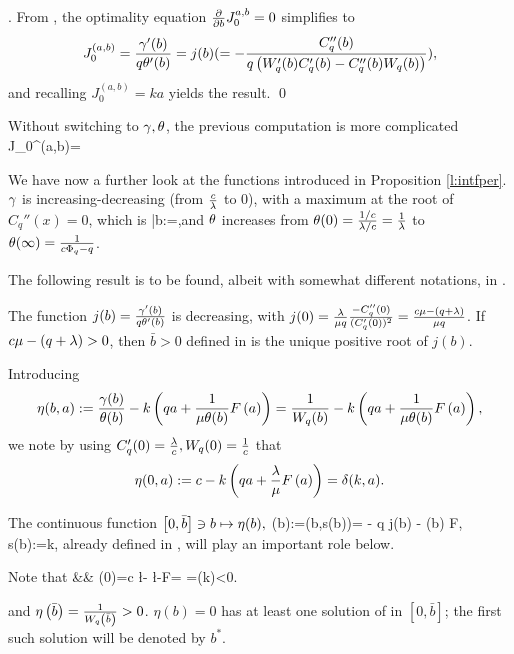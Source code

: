 . From , the optimality equation $\frac{\partial}{\partial b} J_0^{a,b}
=0$ simplifies to
$$J_0^{(a,b)}=\frac{{\gamma'(b)} }
{ q \theta'(b)}=j(b)(=-\frac{C_q''(b)}{q\left( W_q'(b) C_q'(b)-C_q''(b)  W_q(b)\right)}), $$ and recalling $J_0^{(a,b)}=k a$ yields the result.
\qed

\beR Without switching to $\gamma, \theta$, the previous computation is
more complicated
\bea J_0^{(a,b)}=
\eea

\eeR


We have now a further look at  the functions introduced in Proposition \ref{l:intfper}.
\Itm $\gamma$ is increasing-decreasing (from $\frac c {\lambda}$ to $0$), with a maximum at
the root of $C_q''(x)=0$, which is
\be {}\bar{b}:=\log{},\ee and $\theta$ increases from %
$\theta(0)=\frac{1/c}{\lambda/c}=\frac 1{\lambda}$ to $\theta(\infty)=\frac 1{c \Phi_{q} - q }$.%

The following result is to be found, albeit with somewhat different notations, in \cite[Proof of Theorem 11, A2]{AGLW}.


\beL
The function $j(b)=\frac{\gamma'(b)}{q \theta'(b)}$ is decreasing, with  $j(0)=\frac{\lambda}{\mu q}\frac{-C_q''(0)}{(C_q'(0))^2}=
\frac{c \mu -  \left(q +\lambda\right)}{\mu q}$. If  $c \mu -  \left(q +\lambda\right) >0$, then $\bar{b}>0$ defined in  is the unique positive root  of $j({b}) $.
\eeL



\beR Introducing
$$\eta(b,a):=\frac {\gamma(b)}{\theta(b)} -k \left( q a+ \frac 1{\mu \theta(b)} F\left(a\right)\right)=\frac {1}{W_q(b)} -k \left( q a+ \frac 1{\mu \theta(b)} F\left(a\right)\right),$$ we note  by using $C_q'(0)=\frac {\lambda} c, W_q(0)=\frac 1 c$ that $$\eta(0,a):=c -k \left( q a+ \frac {\lambda} {\mu }  F\left(a\right)\right)=\delta(k,a).$$

The continuous function $\left[0,\bar{b}\right]\ni b\mapsto\eta(b),$
\be {} \eta(b):=\eta(b,s(b))=   -
  q j(b) - {\mu \th(b)}  F, \; s(b):=k,\ee
  already defined in ,
  will play an important role below.

   Note that \bea && \eta(0)=\fr c \l-  \l {}-\mu F= =\delta(k)<0.%
\eea

 and    $\eta\left(\bar{b}\right) =\frac{1}{W_q\left(\bar{b}\right)}>0$. \Thr $\eta(b)=0$  has at least one solution of in $[0,\bar{b}]$; the first such solution will be denoted by $b^*$.

